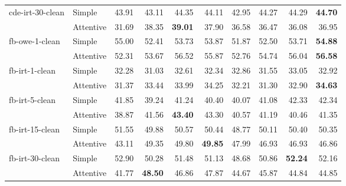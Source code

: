 \begin{tabular}{| l | l | r || r | r | r | r | r | r | r |}
    \multirow{2}{*}{cde-irt-30-clean}
    & Simple    & 43.91 & 43.11 & 44.35 & 44.11 & 42.95 & 44.27 & 44.29 & \textbf{44.70} \\
    & Attentive & 31.69 & 38.35 & \textbf{39.01} & 37.90 & 36.58 & 36.47 & 36.08 & 36.95 \\ \hline \hline

    \multirow{2}{*}{fb-owe-1-clean}
    & Simple    & 55.00 & 52.41 & 53.73 & 53.87 & 51.87 & 52.50 & 53.71 & \textbf{54.88} \\
    & Attentive & 52.31 & 53.67 & 56.52 & 55.87 & 52.76 & 54.74 & 56.04 & \textbf{56.58} \\ \hline

    \multirow{2}{*}{fb-irt-1-clean}
    & Simple    & 32.28 & 31.03 & 32.61 & 32.34 & 32.86 & 31.55 & 33.05 & 32.92 \\
    & Attentive & 31.37 & 33.44 & 33.99 & 34.25 & 32.21 & 31.30 & 32.90 & \textbf{34.63} \\ \hline

    \multirow{2}{*}{fb-irt-5-clean}
    & Simple    & 41.85 & 39.24 & 41.24 & 40.40 & 40.07 & 41.08 & 42.33 & 42.34 \\
    & Attentive & 38.87 & 41.56 & \textbf{43.40} & 43.30 & 40.57 & 41.19 & 40.46 & 41.35 \\ \hline

    \multirow{2}{*}{fb-irt-15-clean}
    & Simple    & 51.55 & 49.88 & 50.57 & 50.44 & 48.77 & 50.11 & 50.40 & 50.35 \\
    & Attentive & 43.11 & 49.35 & 49.80 & \textbf{49.85} & 47.99 & 46.93 & 46.93 & 46.86 \\ \hline

    \multirow{2}{*}{fb-irt-30-clean}
    & Simple    & 52.90 & 50.28 & 51.48 & 51.13 & 48.68 & 50.86 & \textbf{52.24} & 52.16 \\
    & Attentive & 41.77 & \textbf{48.50} & 46.86 & 47.87 & 44.67 & 45.87 & 44.84 & 44.85 \\ \hline

\end{tabular}
